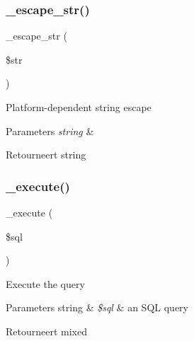 \subsubsection{\texorpdfstring{\_escape\_str()}{\_escape\_str()}}
{\footnotesize\ttfamily \+\_\+escape\+\_\+str (\begin{DoxyParamCaption}\item[{}]{\$str }\end{DoxyParamCaption})\hspace{0.3cm}{\ttfamily [protected]}}

Platform-\/dependent string escape


\begin{DoxyParams}{Parameters}
{\em string} & \\
\hline
\end{DoxyParams}
\begin{DoxyReturn}{Retourneert}
string 
\end{DoxyReturn}
\mbox{\label{class_c_i___d_b__mysqli__driver_a114ab675d89bf8324a41785fb475e86d}} 
\subsubsection{\texorpdfstring{\_execute()}{\_execute()}}
{\footnotesize\ttfamily \+\_\+execute (\begin{DoxyParamCaption}\item[{}]{\$sql }\end{DoxyParamCaption})\hspace{0.3cm}{\ttfamily [protected]}}

Execute the query


\begin{DoxyParams}[1]{Parameters}
string & {\em \$sql} & an S\+QL query \\
\hline
\end{DoxyParams}
\begin{DoxyReturn}{Retourneert}
mixed 
\end{DoxyReturn}
\mbox{\label{class_c_i___d_b__mysqli__driver_aef43f7e3e7b71d337ff3724c5eb14f10}} 
